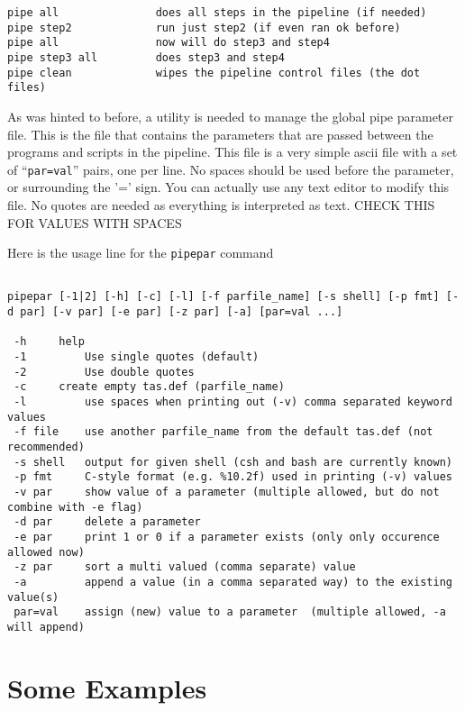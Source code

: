 \documentclass[preprint]{aastex} %
\begin{document}
\footnotesize
\begin{verbatim}
pipe all               does all steps in the pipeline (if needed)
pipe step2             run just step2 (if even ran ok before)
pipe all               now will do step3 and step4
pipe step3 all         does step3 and step4
pipe clean             wipes the pipeline control files (the dot files)
\end{verbatim}
\normalsize

As was hinted to before, a utility is needed to manage the global
pipe parameter file. This is the file that contains the parameters
that are passed between the programs and scripts
in the pipeline. This file is a very simple ascii file with a
set of ``{\tt par=val}''
pairs, one per line. No spaces should be used before the parameter,
or surrounding the '=' sign. 
You can actually use any text editor to modify this file.
No quotes are needed as everything is interpreted as text.  
CHECK THIS FOR VALUES WITH SPACES

Here is the usage line for the {\tt pipepar} command
\footnotesize
\begin{verbatim}

pipepar [-1|2] [-h] [-c] [-l] [-f parfile_name] [-s shell] [-p fmt] [-d par] [-v par] [-e par] [-z par] [-a] [par=val ...]

 -h	    help
 -1         Use single quotes (default)
 -2         Use double quotes
 -c	    create empty tas.def (parfile_name)
 -l         use spaces when printing out (-v) comma separated keyword values
 -f file    use another parfile_name from the default tas.def (not recommended)
 -s shell   output for given shell (csh and bash are currently known)
 -p fmt     C-style format (e.g. %10.2f) used in printing (-v) values
 -v par	    show value of a parameter (multiple allowed, but do not combine with -e flag)
 -d par     delete a parameter
 -e par     print 1 or 0 if a parameter exists (only only occurence allowed now)
 -z par     sort a multi valued (comma separate) value
 -a         append a value (in a comma separated way) to the existing value(s)
 par=val    assign (new) value to a parameter  (multiple allowed, -a will append)  

\end{verbatim}
\normalsize



\section{Some Examples}
\end{document}
